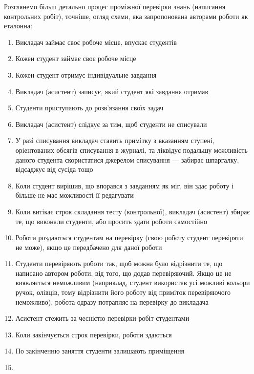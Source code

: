 Розглянемо більш детально процес проміжної перевірки знань (написання
контрольних робіт), точніше, огляд схеми, яка запропонована авторами
роботи як еталонна:

\begin{enumerate}
    \item
        Викладач займає своє робоче місце, впускає студентів
    \item
        Кожен студент займає своє робоче місце
    \item
        Кожен студент отримує індивідуальне завдання
    \item
        Викладач (асистент) записує, який студент які завдання отримав
    \item
        Студенти приступають до розв’язання своїх задач
    \item
        Викладач (асистент) слідкує за тим, щоб студенти не списували
    \item
        У разі списування викладач ставить примітку з вказанням ступені,
        оріентованих обсягів списування в журналі, та ліквідує подальшу
        можливість даного студента скористатися джерелом списування --- забирає
        шпаргалку, відсаджує від сусіда тощо
    \item
        Коли студент вирішив, що впорався з завданням як міг, він здає роботу
        і більше не має можливості її редагувати
    \item
        Коли витікає строк складання тесту (контрольної), викладач (асистент)
        збирає те, що виконали студенти, або просить здати роботи самостійно
    \item
        Роботи роздаються студентам на перевірку (свою роботу студент перевіряти
        не може), якщо це передбачено для даної роботи
    \item
        Студенти перевіряють роботи так, щоб можна було відрізнити те, що
        написано автором роботи, від того, що додав перевіряючий. Якщо це не
        виявляється неможливим (наприклад, студент використав усі можливі
        кольори ручок, олівців, тому відрізнити його роботу від приміток
        перевіряючого неможливо), робота одразу потрапляє на перевірку до
        викладача
    \item
        Асистент стежить за чесністю перевірки робіт студентами
    \item
        Коли закінчується строк перевірки, роботи здаються
    \item
        По закінченню заняття студенти залишають приміщення
    \item

\end{enumerate}
